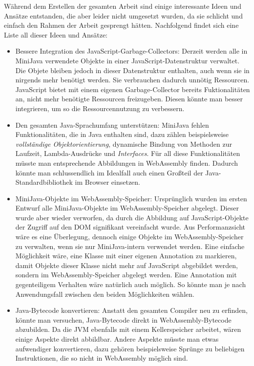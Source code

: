 Während dem Erstellen der gesamten Arbeit sind einige interessante Ideen und Ansätze entstanden, die aber leider nicht umgesetzt wurden, da sie schlicht und einfach den Rahmen der Arbeit gesprengt hätten. Nachfolgend findet sich eine Liste all dieser Ideen und Ansätze:
\begin{itemize}
    \item Bessere Integration des JavaScript-Garbage-Collectors: Derzeit werden alle in MiniJava verwendete Objekte in einer JavaScript-Datenstruktur verwaltet. Die Objete bleiben jedoch in dieser Datenstruktur enthalten, auch wenn sie in nirgends mehr benötigt werden. Sie verbrauchen dadurch unnötig Ressourcen. JavaScript bietet mit einem eigenen Garbage-Collector bereits Fuktionalitäten an, nicht mehr benötigte Ressourcen freizugeben. Diesen könnte man besser integrieren, um so die Ressourcennutzung zu verbessern.
    \item Den gesamten Java-Sprachumfang unterstützen: MiniJava fehlen Funktionalitäten, die in Java enthalten sind, dazu zählen beispielsweise \emph{vollständige Objektorientierung}, dynamische Bindung von Methoden zur Laufzeit, Lambda-Ausdrücke und \emph{Interfaces}. Für all diese Funktionalitäten müsste man entsprechende Abbildungen in WebAssembly finden. Dadurch könnte man schlussendlich im Idealfall auch einen Großteil der Java-Standardbibliothek im Browser einsetzen.
    \item MiniJava-Objekte im WebAssembly-Speicher: Ursprünglich wurden im ersten Entwurf alle MiniJava-Objekte im WebAssembly-Speicher abgelegt. Dieser wurde aber wieder verworfen, da durch die Abbildung auf JavaScript-Objekte der Zugriff auf den DOM signifikant vereinfacht wurde. Aus Performanzsicht wäre es eine Überlegung, dennoch einige Objekte im WebAssembly-Speicher zu verwalten, wenn sie nur MiniJava-intern verwendet werden. Eine einfache Möglichkeit wäre, eine Klasse mit einer eigenen Annotation zu markieren, damit Objekte dieser Klasse nicht mehr auf JavaScript abgebildet werden, sondern im WebAssembly-Speicher abgelegt werden. Eine Annotation mit gegenteiligem Verhalten wäre natürlich auch möglich. So könnte man je nach Anwendungsfall zwischen den beiden Möglichkeiten wählen.
    \item Java-Bytecode konvertieren: Anstatt den gesamten Compiler neu zu erfinden, könnte man versuchen, Java-Bytecode direkt in WebAssembly-Bytecode abzubilden. Da die JVM ebenfalls mit einem Kellerspeicher arbeitet, wären einige Aspekte direkt abbildbar. Andere Aspekte müsste man etwas aufwendiger konvertieren, dazu gehören beispielsweise Sprünge zu beliebigen Instruktionen, die so nicht in WebAssembly möglich sind.

\end{itemize}
